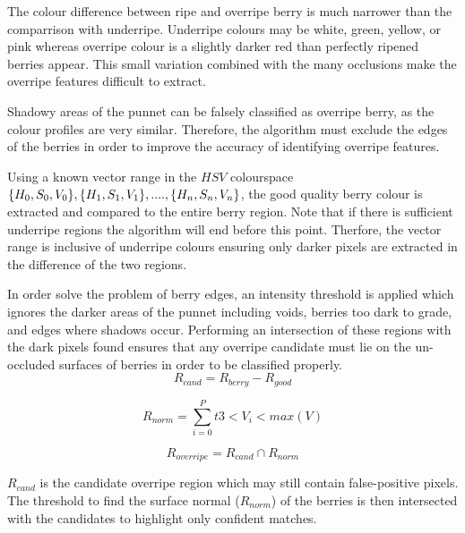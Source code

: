 \documentclass{bmvc2k}
\begin{document}
The colour difference between ripe and overripe berry is much narrower than the comparrison with underripe. Underripe colours may be white, green, yellow, or pink whereas overripe colour is a slightly darker red than perfectly ripened berries appear. This small variation combined with the many occlusions make the overripe features difficult to extract.

Shadowy areas of the punnet can be falsely classified as overripe berry, as the colour profiles are very similar. Therefore, the algorithm must exclude the edges of the berries in order to improve the accuracy of identifying overripe features. 

Using a known vector range in the $HSV$ colourspace $\{H_0, S_0, V_0\}, \{H_1, S_1, V_1\},....,\\\{H_n, S_n, V_n\}$, the good quality berry colour is  extracted and compared to the entire berry region. Note that if there is sufficient underripe regions the algorithm will end before this point. Therfore, the vector range is inclusive of underripe colours ensuring only darker pixels are extracted in the difference of the two regions.


In order solve the problem of berry edges, an intensity threshold is applied which ignores the darker areas of the punnet including voids, berries too dark to grade, and edges where shadows occur. Performing an intersection of these regions with the dark pixels found ensures that any overripe candidate must lie on the un-occluded surfaces of berries in order to be classified properly. 
\begin{equation}
R_{cand} = R_{berry} - R_{good}
\label{diff_berry_hue}
\end{equation}

\begin{equation}
R_{norm} = \sum_{i=0}^{P}t3<V_i<max(V)
\label{berry_tops}
\end{equation}

\begin{equation}
R_{overripe} = R_{cand} \cap R_{norm}
\label{intersect_dark_berry}
\end{equation}

$R_{cand}$ is the candidate overripe region which may still contain false-positive pixels. The threshold to find the surface normal ($R_{norm}$) of the berries is then intersected with the candidates to highlight only confident matches.


\end{document}
